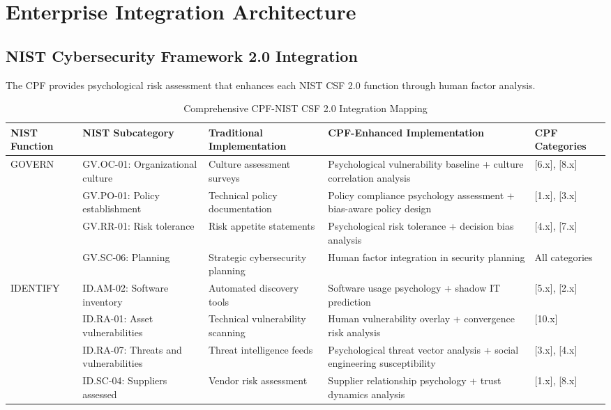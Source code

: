 \documentclass[10pt,twocolumn]{IEEEtran}
\begin{document}
\section{Enterprise Integration Architecture}

\subsection{NIST Cybersecurity Framework 2.0 Integration}

The CPF provides psychological risk assessment that enhances each NIST CSF 2.0 function through human factor analysis.

\begin{table*}[t]
\centering
\caption{Comprehensive CPF-NIST CSF 2.0 Integration Mapping}
\label{tab:nist_integration}
\begin{tabular}{@{}p{2cm}p{3cm}p{4cm}p{4cm}p{3cm}@{}}
\toprule
\textbf{NIST Function} & \textbf{NIST Subcategory} & \textbf{Traditional Implementation} & \textbf{CPF-Enhanced Implementation} & \textbf{CPF Categories} \\
\midrule
\multirow{4}{2cm}{GOVERN} 
& GV.OC-01: Organizational culture & Culture assessment surveys & Psychological vulnerability baseline + culture correlation analysis & [6.x], [8.x] \\
& GV.PO-01: Policy establishment & Technical policy documentation & Policy compliance psychology assessment + bias-aware policy design & [1.x], [3.x] \\
& GV.RR-01: Risk tolerance & Risk appetite statements & Psychological risk tolerance + decision bias analysis & [4.x], [7.x] \\
& GV.SC-06: Planning & Strategic cybersecurity planning & Human factor integration in security planning & All categories \\
\midrule
\multirow{6}{2cm}{IDENTIFY}
& ID.AM-02: Software inventory & Automated discovery tools & Software usage psychology + shadow IT prediction & [5.x], [2.x] \\
& ID.RA-01: Asset vulnerabilities & Technical vulnerability scanning & Human vulnerability overlay + convergence risk analysis & [10.x] \\
& ID.RA-07: Threats and vulnerabilities & Threat intelligence feeds & Psychological threat vector analysis + social engineering susceptibility & [3.x], [4.x] \\
& ID.SC-04: Suppliers assessed & Vendor risk assessment & Supplier relationship psychology + trust dynamics analysis & [1.x], [8.x] \\

\end{tabular}
\end{table*}
\end{document}

